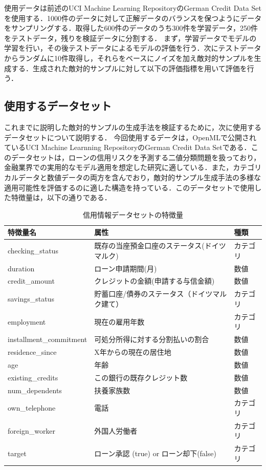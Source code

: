 使用データは前述のUCI Machine Learning RepositoryのGerman Credit Data Setを使用する．1000件のデータに対して正解データのバランスを保つようにデータをサンプリングする．取得した600件のデータのうち300件を学習データ，250件をテストデータ，残りを検証データに分割する．
まず，学習データでモデルの学習を行い，その後テストデータによるモデルの評価を行う．次にテストデータからランダムに10件取得し，それらをベースにノイズを加え敵対的サンプルを生成する．生成された敵対的サンプルに対して以下の評価指標を用いて評価を行う．

\subsection{使用するデータセット}
これまでに説明した敵対的サンプルの生成手法を検証するために，次に使用するデータセットについて説明する．
今回使用するデータは，OpenMLで公開されているUCI Machine Learnning RepositoryのGerman Credit Data Setである．\cite{credit-g}このデータセットは，ローンの信用リスクを予測する二値分類問題を扱っており，金融業界での実用的なモデル適用を想定した研究に適している．また，カテゴリカルデータと数値データの両方を含んでおり，敵対的サンプル生成手法の多様な適用可能性を評価するのに適した構造を持っている．このデータセットで使用した特徴量は，以下の通りである．

\begin{table}[H]
    \centering
    \caption{信用情報データセットの特徴量}
    \begin{tabular}{|l|l|l|}
        \hline
        特徴量名 & 属性 & 種類 \\ \hline
        checking\_status & 既存の当座預金口座のステータス(ドイツマルク) & カテゴリ \\ \hline
        duration & ローン申請期間(月) & 数値 \\ \hline
        credit\_amount & クレジットの金額(申請する与信金額) & 数値 \\ \hline
        savings\_status & 貯蓄口座/債券のステータス（ドイツマルク建て） & カテゴリ \\ \hline
        employment & 現在の雇用年数 & カテゴリ \\ \hline
        installment\_commitment & 可処分所得に対する分割払いの割合 & 数値 \\ \hline
        residence\_since & X年からの現在の居住地 & 数値 \\ \hline
        age & 年齢 & 数値 \\ \hline
        existing\_credits & この銀行の既存クレジット数 & 数値 \\ \hline
        num\_dependents & 扶養家族数 & 数値 \\ \hline
        own\_telephone & 電話 & カテゴリ \\ \hline
        foreign\_worker & 外国人労働者 & カテゴリ \\ \hline
        target & ローン承認 (true) or ローン却下(false) & カテゴリ \\ \hline
    \end{tabular}
    \label{tab:credit_g_features}
\end{table}

